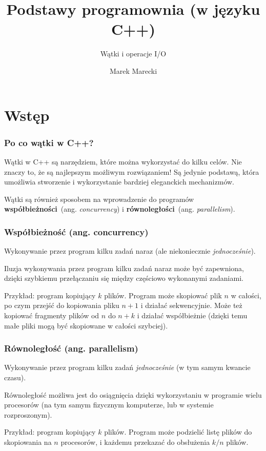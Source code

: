 \documentclass[aspectratio=169]{beamer}
\title{Podstawy programownia (w języku C++)}
\subtitle{Wątki i operacje I/O}
\author{Marek Marecki}
\institute{Polsko-Japońska Akademia Technik Komputerowych}
\begin{document}
{%
    \frame{\titlepage}
}

\section{Wstęp}

\begin{frame}
    \frametitle{Po co wątki w C++?}

    Wątki w C++ są narzędziem, które można wykorzystać do kilku celów. Nie
    znaczy to, że są najlepszym możliwym rozwiązaniem! Są jedynie podstawą,
    która umożliwia stworzenie i wykorzystanie bardziej eleganckich mechanizmów.

    \vspace{1em}

    Wątki są również sposobem na wprowadzenie do programów
    \textbf{współbieżności}~(ang. \emph{concurrency}) i
    \textbf{równoległości}~(ang. \emph{parallelism}).
\end{frame}

\begin{frame}
    \frametitle{Współbieżność (ang. concurrency)}

    Wykonywanie przez program kilku zadań naraz (ale niekoniecznie
    \emph{jednocześnie}).

    \vspace{1em}

    Iluzja wykonywania przez program kilku zadań naraz może być zapewniona,
    dzięki szybkiemu przełączaniu się między częściowo wykonanymi zadaniami.

    \vspace{1em}

    Przykład: program kopiujący $k$ plików. Program może skopiować plik $n$ w
    całości, po czym przejść do kopiowania pliku $n+1$ i działać sekwencyjnie.
    Może też kopiować fragmenty plików od $n$ do $n+k$ i działać współbieżnie
    (dzięki temu małe pliki mogą być skopiowane w całości szybciej).
\end{frame}

\begin{frame}
    \frametitle{Równoległość (ang. parallelism)}

    Wykonywanie przez program kilku zadań \emph{jednocześnie} (w tym samym
    kwancie czasu).

    \vspace{1em}

    Równoległość możliwa jest do osiągnięcia dzięki wykorzystaniu w programie
    wielu procesorów (na tym samym fizycznym komputerze, lub w systemie
    rozproszonym).

    \vspace{1em}

    Przykład: program kopiujący $k$ plików. Program może podzielić listę plików
    do skopiowania na $n$ procesorów, i każdemu przekazać do obsłużenia $k/n$
    plików.
\end{frame}
\end{document}
